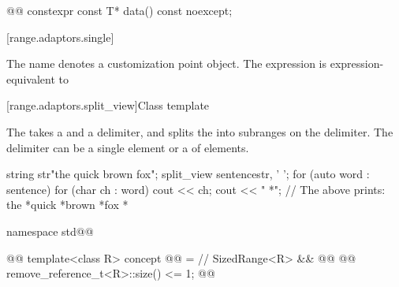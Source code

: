 {%
\begin{itemdecl}
@@
constexpr const T* data() const noexcept;
\end{itemdecl}

\begin{itemdescr}
\pnum
{}

\pnum
{}

\pnum
{}
\end{itemdescr}

[range.adaptors.single]{}

\pnum
The name  denotes a customization point
object.  The expression
  is
expression-equivalent to  


[range.adaptors.split_view]{Class template }

\pnum
The  takes a   and a
delimiter, and splits the   into
subranges on the delimiter. The delimiter can be a single element or a
  of elements.

\pnum
\begin{example}
\begin{codeblock}
string str{"the quick brown fox"};
split_view sentence{str, ' '};
for (auto word : sentence) {
  for (char ch : word)
    cout << ch;
  cout << " *";
}
// The above prints: the *quick *brown *fox *
\end{codeblock}
\end{example}

\begin{codeblock}
namespace std@@ { @@
  template<class R>
  concept @@ = // \expos
    SizedRange<R> && @@
      @@ remove_reference_t<R>::size() <= 1;
    @\oldtxt{\};}@

}
\end{codeblock}}
